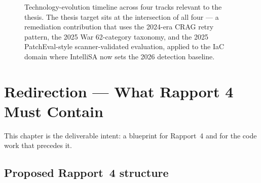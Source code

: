 \documentclass[11pt, a4paper]{report}
\begin{document}
\begin{figure}[H]
{
  }
  \caption{Technology-evolution timeline across four tracks relevant to the
    thesis. The thesis target sits at the intersection of all four --- a
    remediation contribution that uses the 2024-era CRAG retry pattern,
    the 2025 War 62-category taxonomy, and the 2025 PatchEval-style
    scanner-validated evaluation, applied to the IaC domain where
    IntelliSA now sets the 2026 detection baseline.}
  \label{fig:timeline}
\end{figure}

\chapter{Redirection --- What Rapport 4 Must Contain}
\label{chap:redirection}

This chapter is the deliverable intent: a blueprint for Rapport~4 and for
the code work that precedes it.

\section{Proposed Rapport~4 structure}
\end{document}
